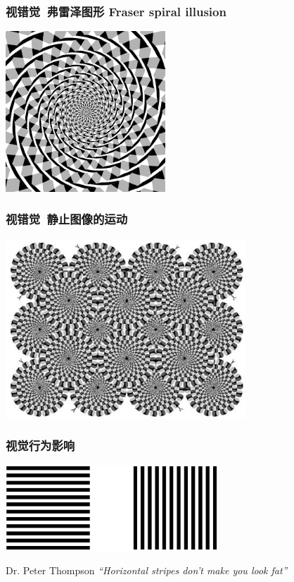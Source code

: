 \documentclass{beamer}
\begin{document}
\begin{frame}
	\frametitle{视错觉~{\small 弗雷泽图形 Fraser spiral illusion}}
	\begin{center}
	\includegraphics[width=6cm]{images/597px-Fraser_spiral.svg.png}\\
	\end{center}
\end{frame}

\begin{frame}
	\frametitle{视错觉~{\small 静止图像的运动}}
	\includegraphics[width=9cm]{images/illusion1.jpg}
\end{frame}

\begin{frame}
	\frametitle{视觉行为影响}
	\transwipe
	\begin{center}
		\includegraphics[width=8cm]{images/bar_comparison.jpg}\\\pause
		\begin{beamerboxesrounded}[shadow=true]{Dr. Peter Thompson}
			\textit{``Horizontal stripes don't make you look fat''}
		\end{beamerboxesrounded}
	\end{center}
\end{frame}
\end{document}

